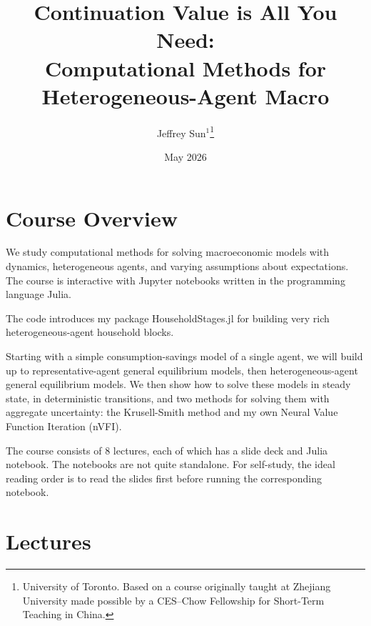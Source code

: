 \documentclass[11pt]{article}
\title{Continuation Value is All You Need: \\
Computational Methods for Heterogeneous-Agent Macro}
\author{Jeffrey Sun$^1$\footnote{University of Toronto. Based on a course originally taught at Zhejiang University made possible by a CES--Chow Fellowship for Short-Term Teaching in China.}}
\date{}
\begin{document}
\date{May 2026}
\maketitle

\vspace*{-1em}
\section*{Course Overview}

We study computational methods for solving macroeconomic models with dynamics, heterogeneous agents, and varying
assumptions about expectations. The course is interactive with Jupyter notebooks written in the programming language Julia.

The code introduces my package HouseholdStages.jl for building very rich heterogeneous-agent household blocks.

Starting with a simple consumption-savings
model of a single agent, we will build up to representative-agent
general equilibrium models, then heterogeneous-agent general
equilibrium models. We then show how to solve these models
in steady state, in deterministic transitions, and two methods for
solving them with aggregate uncertainty: the Krusell-Smith method
and my own Neural Value Function Iteration (nVFI).

The course consists of 8 lectures, each of which has a
slide deck and Julia notebook. The notebooks are not quite standalone.
For self-study, the ideal reading order is to read the slides first
before running the corresponding notebook.

\section*{Lectures}
\end{document}
